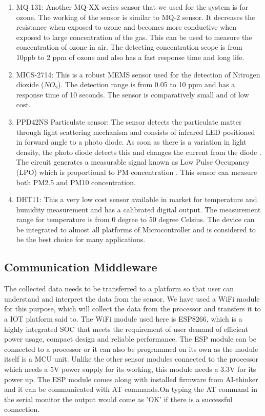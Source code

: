 \documentclass[12pt,a4paper,oneside]{report}
\begin{document}
\begin{enumerate}
\item MQ 131: Another MQ-XX series sensor that we used for the system is for ozone. The working of the sensor is similar to MQ-2 sensor. It decreases the resistance when exposed to ozone and becomes more conductive when exposed to large concentration of the gas. This can be used to measure the concentration of ozone in air. The detecting concentration scope is from 10ppb to 2 ppm of ozone and also has a fast response time and long life.

\item MICS-2714: This is a robust MEMS sensor used for the detection of Nitrogen dioxide ($NO_2$). The detection range is from 0.05 to 10 ppm and has a response time of 10 seconds. The sensor is comparatively small and of low cost.

\item  PPD42NS Particulate sensor: The sensor detects the particulate matter through light scattering mechanism and consists of infrared LED positioned in forward angle to a photo diode. As soon as there is a variation in light density, the photo diode detects this and changes the current from the diode \cite{Allen2002}. The circuit generates a measurable signal known as Low Pulse Occupancy (LPO) which is proportional to PM concentration \cite{Kuula2017}. This sensor can measure both PM2.5 and PM10 concentration.

\item DHT11: This a very low cost sensor available in market for temperature and humidity measurement and has a calibrated digital output. The measurement range for temperature is from 0 degree to 50 degree Celsius. The device can be integrated to almost all platforms of Microcontroller and is considered to be the best choice for many applications.

 \end{enumerate}

 \subsection*{Communication Middleware}
 
 The collected data needs to be transferred to a platform so that user can understand and interpret the data from the sensor. We have used a WiFi module for this purpose, which will collect the data from the processor and transfers it to a IOT platform said to. The WiFi module used here is ESP8266, which is a highly integrated SOC that meets the requirement of user demand of efficient power usage, compact design and reliable performance\cite{Systems2018}. The ESP module can be connected to a processor or it can also be programmed on its own as the module itself is a MCU unit. Unlike the other sensor modules connected to the processor which needs a 5V power supply for its working, this module needs a 3.3V for its power up. The ESP module comes along with installed firmware from AI-thinker and it can be communicated with AT commands.On typing the AT command in the serial monitor the output would come as 'OK' if there is a successful connection. 
\end{document}
